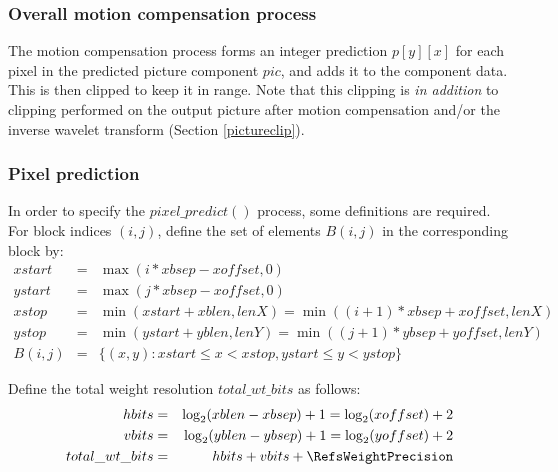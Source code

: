 \subsubsection{Overall motion compensation process}
\label{mcprocess}

The motion compensation process forms an integer prediction $p[y][x]$ for each pixel in the predicted
picture component $pic$, and adds it to the component data. This is then clipped to keep it in range.
Note that this clipping is {\em in addition} to clipping performed on the output picture after motion
 compensation and/or the inverse wavelet transform (Section \ref{pictureclip}).

\begin{pseudo*}
    \bsEND
\bsEND
\end{pseudo*}

\subsubsection{Pixel prediction}
\label{pixelpredict}

In order to specify the $pixel\_predict()$ process, some definitions are required. For block indices $(i,j)$, 
define the set of elements $B(i,j)$ in the corresponding
block by:
\begin{eqnarray*}
xstart & = & \max(i*xbsep-xoffset, 0) \\
ystart & = & \max(j*xbsep-xoffset, 0) \\
xstop & = & \min\left( xstart+xblen, lenX\right)= \min\left( (i+1)*xbsep+xoffset, lenX\right)\\
ystop & = & \min\left( ystart+yblen, lenY\right)= \min\left( (j+1)*ybsep+yoffset, lenY\right)\\
B(i,j) & = & \{(x,y): xstart\leq x<xstop, ystart\leq y<ystop\}
\end{eqnarray*}

Define the total weight resolution $total\_wt\_bits$ as follows: 
\begin{eqnarray*}
hbits  & = & \log_2(xblen-xbsep)+1 = \log_2(xoffset)+2 \\
vbits  & = & \log_2(yblen-ybsep)+1 = \log_2(yoffset)+2 \\
total\_wt\_bits & = & hbits+vbits+\RefsWeightPrecision
\end{eqnarray*}

